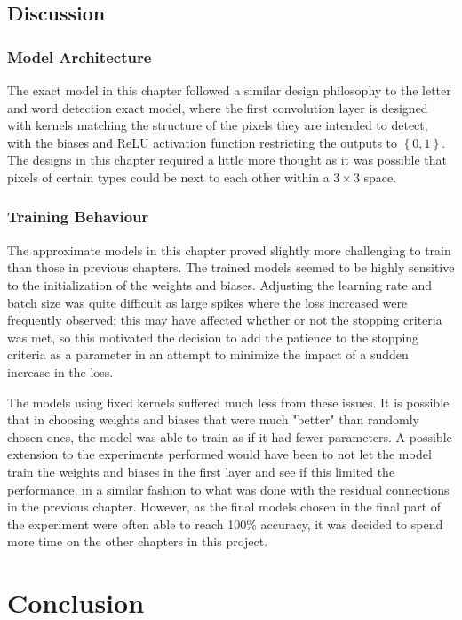 \documentclass{somasmsc}
\begin{document}
\section{Discussion}

\subsection{Model Architecture}

The exact model in this chapter followed a similar design philosophy to the letter and word detection exact model, where the first convolution layer is designed with kernels matching the structure of the pixels they are intended to detect, with the biases and ReLU activation function restricting the outputs to $\left\{0,1\right\}$. The designs in this chapter required a little more thought as it was possible that pixels of certain types could be next to each other within a $3 \times 3$ space.

\subsection{Training Behaviour}

The approximate models in this chapter proved slightly more challenging to train than those in previous chapters. The trained models seemed to be highly sensitive to the initialization of the weights and biases. Adjusting the learning rate and batch size was quite difficult as large spikes where the loss increased were frequently observed; this may have affected whether or not the stopping criteria was met, so this motivated the decision to add the patience to the stopping criteria as a parameter in an attempt to minimize the impact of a sudden increase in the loss.

The models using fixed kernels suffered much less from these issues. It is possible that in choosing weights and biases that were much "better" than randomly chosen ones, the model was able to train as if it had fewer parameters. A possible extension to the experiments performed would have been to not let the model train the weights and biases in the first layer and see if this limited the performance, in a similar fashion to what was done with the residual connections in the previous chapter. However, as the final models chosen in the final part of the experiment were often able to reach 100\% accuracy, it was decided to spend more time on the other chapters in this project.


\chapter{Conclusion}
\end{document}
